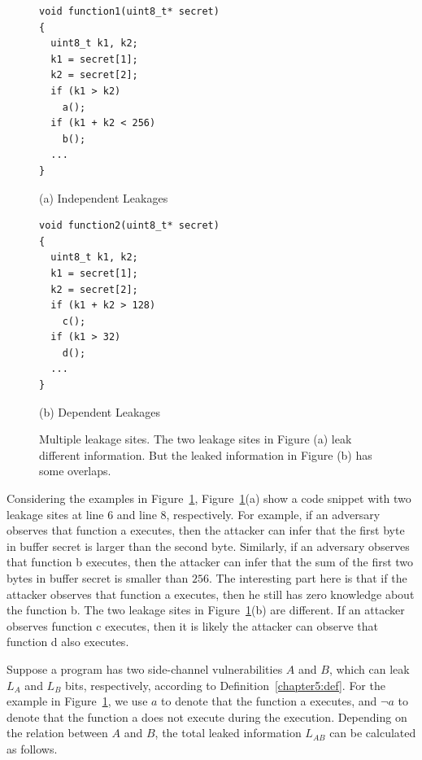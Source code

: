 \begin{figure}[h]
\begin{minipage}{0.46\linewidth}
\begin{lstlisting}
void function1(uint8_t* secret)
{
  uint8_t k1, k2;
  k1 = secret[1];
  k2 = secret[2];
  if (k1 > k2)
    a();
  if (k1 + k2 < 256)
    b();
  ...
}
\end{lstlisting}\caption*{(a) Independent Leakages}
\end{minipage}
\hfill
\begin{minipage}{0.46\linewidth}
\begin{lstlisting}
void function2(uint8_t* secret)
{
  uint8_t k1, k2;
  k1 = secret[1];
  k2 = secret[2];
  if (k1 + k2 > 128)
    c();
  if (k1 > 32)
    d();
  ...
}
\end{lstlisting} \caption*{(b) Dependent Leakages}
\end{minipage}
\caption{Multiple leakage sites. The two leakage sites in Figure (a) leak different information. But the leaked information in Figure (b) has some overlaps. }\label{chapter5:fig:multiple}
\end{figure}

Considering the examples in Figure~\ref{chapter5:fig:multiple}, Figure~\ref{chapter5:fig:multiple}(a) show a code snippet with two leakage sites at line 6 and line 8, respectively. For example, if an adversary observes that function \textsf{a} executes, then the attacker can infer that the first byte in buffer \textsf{secret} is larger than the second byte.  Similarly, if an adversary observes that function \textsf{b} executes, then the attacker can infer that the sum of the first two bytes in buffer \textsf{secret} is smaller than $256$. The interesting part here is that if the attacker observes that function \textsf{a} executes, then he still has zero knowledge about the function \textsf{b}. The two leakage sites in Figure~\ref{chapter5:fig:multiple}(b) are different. If an attacker observes function \textsf{c} executes, then it is likely the attacker can observe that function \textsf{d} also executes. 

Suppose a program has two side-channel vulnerabilities $A$ and $B$, which can leak $L_A$ and $L_B$ bits, respectively, according to Definition~\ref{chapter5:def}. 
For the example in Figure~\ref{chapter5:fig:multiple}, we use $a$ to denote that the function \textsf{a} executes, and $\lnot a$ to denote that the function \textsf{a} does not execute during the execution.
Depending on the relation between $A$ and $B$, the total leaked information $L_{\mathit{AB}}$ can be calculated as follows.

